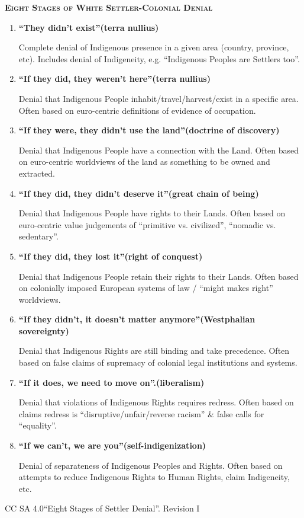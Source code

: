 \documentclass[14pt]{extarticle}
\begin{document}
\begin{center}
{\large\scshape\bfseries Eight Stages of White Settler-Colonial Denial}
\end{center}
\vspace{1em}

\begin{enumerate}[leftmargin=0in]
\item {\bfseries``They didn't exist''\hfill(terra nullius)}

Complete denial of Indigenous presence in a given area (country, province, etc).
Includes denial of Indigeneity, e.g. ``Indigenous Peoples are Settlers too''.

\item {\bfseries``If they did, they weren't here''\hfill(terra nullius)}

Denial that Indigenous People inhabit/travel/harvest/exist in a specific area.
Often based on euro-centric definitions of evidence of occupation.

\item {\bfseries``If they were, they didn't use the land''\hfill(doctrine of discovery)}

Denial that Indigenous People have a connection with the Land.
Often based on euro-centric worldviews of the land as something to be owned and extracted.

\item {\bfseries``If they did, they didn't deserve it''\hfill(great chain of being)}

Denial that Indigenous People have rights to their Lands.
Often based on euro-centric value judgements of ``primitive vs. civilized'', ``nomadic vs. sedentary''.

\item {\bfseries``If they did, they lost it''\hfill(right of conquest)}

Denial that Indigenous People retain their rights to their Lands.
Often based on colonially imposed European systems of law / ``might makes right'' worldviews.

\item {\bfseries``If they didn't, it doesn't matter anymore''\hfill(Westphalian sovereignty)}

Denial that Indigenous Rights are still binding and take precedence.
Often based on false claims of supremacy of colonial legal institutions and systems.

\item {\bfseries``If it does, we need to move on''.\hfill(liberalism)}

Denial that violations of Indigenous Rights requires redress.
Often based on claims redress is ``disruptive/unfair/reverse racism'' \& false calls for ``equality''.

\item {\bfseries``If we can't, we are you''\hfill(self-indigenization)}

Denial of separateness of Indigenous Peoples and Rights.
Often based on attempts to reduce Indigenous Rights to Human Rights, claim Indigeneity, etc.
\end{enumerate}

\vfill



{\footnotesize CC SA 4.0\hfill``Eight Stages of Settler Denial''. Revision I}
\end{document}
